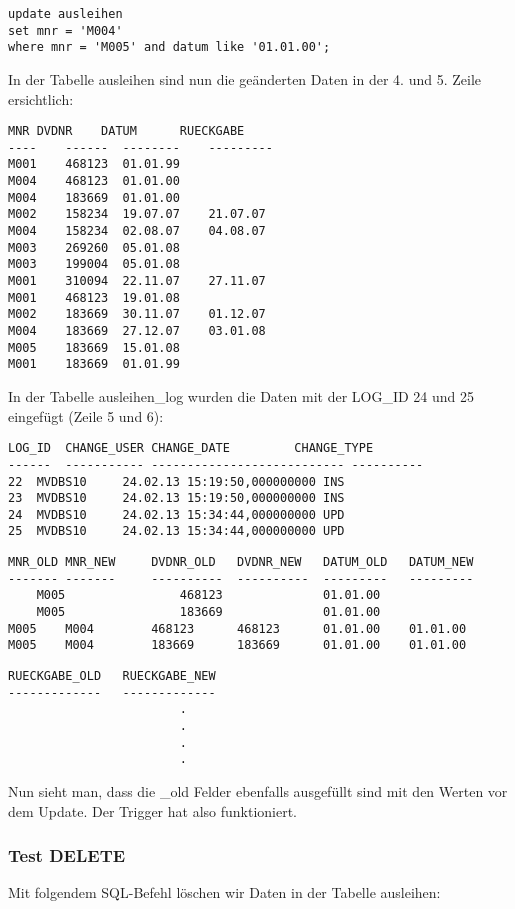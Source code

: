 \documentclass[11pt,a4paper,parskip=half]{scrartcl}
\begin{document}
\begin{lstlisting}
update ausleihen
set mnr = 'M004'
where mnr = 'M005' and datum like '01.01.00';
\end{lstlisting}

In der Tabelle ausleihen sind nun die geänderten Daten in der 4. und 5. Zeile ersichtlich:

\begin{lstlisting}
MNR	DVDNR	 DATUM		RUECKGABE
---- 	------	-------- 	---------
M001	468123 	01.01.99	
M004	468123	01.01.00	
M004	183669	01.01.00	
M002	158234 	19.07.07	21.07.07  
M004	158234 	02.08.07	04.08.07  
M003	269260 	05.01.08	
M003	199004 	05.01.08	
M001	310094 	22.11.07	27.11.07  
M001	468123 	19.01.08	
M002	183669 	30.11.07	01.12.07  
M004	183669 	27.12.07	03.01.08  
M005	183669	15.01.08	
M001	183669	01.01.99	
\end{lstlisting}

In der Tabelle ausleihen\_log wurden die Daten mit der LOG\_ID 24 und 25 eingefügt (Zeile 5 und 6):

\begin{lstlisting}
LOG_ID	CHANGE_USER	CHANGE_DATE			CHANGE_TYPE	
------	-----------	---------------------------	----------		
22	MVDBS10		24.02.13 15:19:50,000000000	INS					
23	MVDBS10		24.02.13 15:19:50,000000000	INS					
24	MVDBS10		24.02.13 15:34:44,000000000	UPD					
25	MVDBS10		24.02.13 15:34:44,000000000	UPD					
\end{lstlisting}

\begin{lstlisting}
MNR_OLD	MNR_NEW		DVDNR_OLD	DVDNR_NEW	DATUM_OLD	DATUM_NEW	
-------	-------		----------	----------	---------	--------- 	
	M005				468123				01.01.00					
	M005				183669				01.01.00					
M005	M004		468123		468123		01.01.00	01.01.00				
M005	M004		183669		183669		01.01.00	01.01.00				
\end{lstlisting}
\begin{lstlisting}
RUECKGABE_OLD	RUECKGABE_NEW
-------------	-------------	
						.
						.
						.
						.
\end{lstlisting}

Nun sieht man, dass die \_old Felder ebenfalls ausgefüllt sind mit den Werten vor dem Update. Der Trigger hat also funktioniert.

\subsubsection{Test DELETE}
Mit folgendem SQL-Befehl löschen wir Daten in der Tabelle ausleihen:
\end{document}
